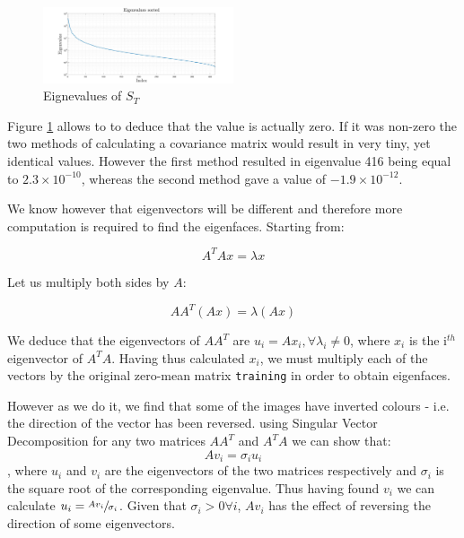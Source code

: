 \documentclass[10pt,twocolumn,letterpaper]{article}
\begin{document}
\begin{figure}[H]
\centering
\includegraphics[width=0.5\textwidth]{../results/Q1B_PCA_Eigenvalues}

  \caption{Eignevalues of $S_T$ \label{fig:Eig3}}

\end{figure}
\setlength{\belowdisplayshortskip}{0pt}
\setlength{\abovedisplayshortskip}{0pt}
Figure \ref{fig:Eig3} allows to to deduce that the  value is actually zero. If it was non-zero the two methods of calculating a covariance matrix would result in very tiny, yet identical values. However the first method resulted in eigenvalue 416 being equal to $2.3 \times 10^{-10}$, whereas the second method gave a value of $-1.9 \times 10^{-12}$.

We know however that eigenvectors will be different and therefore more computation is required to find the eigenfaces. Starting from:

\begin{equation}
A^TAx = \lambda x
\end{equation}

Let us multiply both sides by $A$:

\begin{equation}
AA^T(Ax) = \lambda (Ax)
\end{equation}

We deduce that the eigenvectors of $AA^T$ are $u_i = Ax_i, \forall \lambda_i \neq 0$, where $x_i$ is the i$^{th}$ eigenvector of $A^TA$. Having thus calculated $x_i$, we must multiply each of the vectors by the original zero-mean matrix {\tt\small training} in order to obtain eigenfaces.

However as we do it, we find that some of the images have inverted colours - i.e. the direction of the vector has been reversed. using Singular Vector Decomposition for any two matrices $AA^T$ and $A^TA$ we can show that:
\begin{equation}
Av_i = \sigma_i u_i
\end{equation}
, where $u_i$ and $v_i$ are the eigenvectors of the two matrices respectively and $\sigma_i$ is the square root of the corresponding eigenvalue. Thus having found $v_i$ we can calculate $u_i = \sfrac{Av_i}{\sigma_i}$. Given that $\sigma_i > 0  \forall i$, $Av_i$ has the effect of reversing the direction of some eigenvectors.
\end{document}
